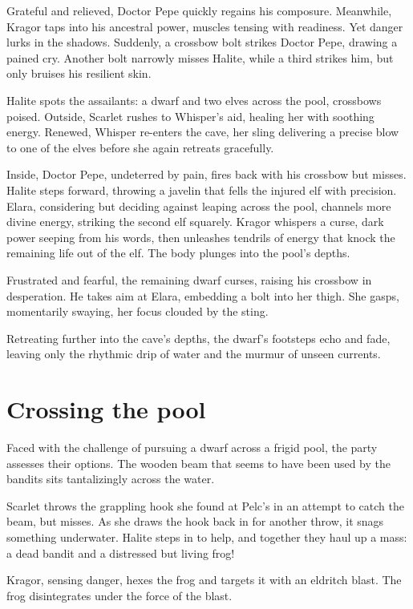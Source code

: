 \documentclass[
  letterpaper,12pt,twoside,twocolumn,openany,
  nodeprecatedcode,bg=full]{dndbook}
\begin{document}
Grateful and relieved, Doctor Pepe quickly regains his composure.
Meanwhile, Kragor taps into his ancestral power, muscles tensing with
readiness. Yet danger lurks in the shadows. Suddenly, a crossbow bolt
strikes Doctor Pepe, drawing a pained cry. Another bolt narrowly misses
Halite, while a third strikes him, but only bruises his resilient skin.

Halite spots the assailants: a dwarf and two elves across the pool,
crossbows poised. Outside, Scarlet rushes to Whisper's aid, healing her
with soothing energy. Renewed, Whisper re-enters the cave, her sling
delivering a precise blow to one of the elves before she again retreats
gracefully.

Inside, Doctor Pepe, undeterred by pain, fires back with his crossbow
but misses. Halite steps forward, throwing a javelin that fells the
injured elf with precision. Elara, considering but deciding against
leaping across the pool, channels more divine energy, striking the
second elf squarely. Kragor whispers a curse, dark power seeping from
his words, then unleashes tendrils of energy that knock the remaining
life out of the elf. The body plunges into the pool's depths.

Frustrated and fearful, the remaining dwarf curses, raising his crossbow
in desperation. He takes aim at Elara, embedding a bolt into her thigh.
She gasps, momentarily swaying, her focus clouded by the sting.

Retreating further into the cave's depths, the dwarf's footsteps echo
and fade, leaving only the rhythmic drip of water and the murmur of
unseen currents.

\section{Crossing the pool}\label{crossing-the-pool}

Faced with the challenge of pursuing a dwarf across a frigid pool, the
party assesses their options. The wooden beam that seems to have been
used by the bandits sits tantalizingly across the water.

Scarlet throws the grappling hook she found at Pelc's in an attempt to
catch the beam, but misses. As she draws the hook back in for another
throw, it snags something underwater. Halite steps in to help, and
together they haul up a mass: a dead bandit and a distressed but living
frog!

Kragor, sensing danger, hexes the frog and targets it with an eldritch
blast. The frog disintegrates under the force of the blast.
\end{document}
